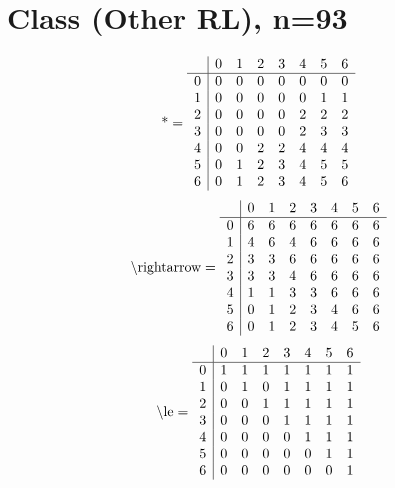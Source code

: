\documentclass[11pt]{article}
\begin{document}
\section{Class (Other RL), n=93}
\[\text{*} = 
\begin{array}{r | r r r r r r r}
 & 0 & 1 & 2 & 3 & 4 & 5 & 6 \\ \hline
0 & 0 & 0 & 0 & 0 & 0 & 0 & 0 \\
1 & 0 & 0 & 0 & 0 & 0 & 1 & 1 \\
2 & 0 & 0 & 0 & 0 & 2 & 2 & 2 \\
3 & 0 & 0 & 0 & 0 & 2 & 3 & 3 \\
4 & 0 & 0 & 2 & 2 & 4 & 4 & 4 \\
5 & 0 & 1 & 2 & 3 & 4 & 5 & 5 \\
6 & 0 & 1 & 2 & 3 & 4 & 5 & 6 \\
\end{array}
\]
\[\text{\textbackslash rightarrow} = 
\begin{array}{r | r r r r r r r}
 & 0 & 1 & 2 & 3 & 4 & 5 & 6 \\ \hline
0 & 6 & 6 & 6 & 6 & 6 & 6 & 6 \\
1 & 4 & 6 & 4 & 6 & 6 & 6 & 6 \\
2 & 3 & 3 & 6 & 6 & 6 & 6 & 6 \\
3 & 3 & 3 & 4 & 6 & 6 & 6 & 6 \\
4 & 1 & 1 & 3 & 3 & 6 & 6 & 6 \\
5 & 0 & 1 & 2 & 3 & 4 & 6 & 6 \\
6 & 0 & 1 & 2 & 3 & 4 & 5 & 6 \\
\end{array}
\]
\[\text{\textbackslash le} = 
\begin{array}{r | r r r r r r r}
 & 0 & 1 & 2 & 3 & 4 & 5 & 6 \\ \hline
0 & 1 & 1 & 1 & 1 & 1 & 1 & 1 \\
1 & 0 & 1 & 0 & 1 & 1 & 1 & 1 \\
2 & 0 & 0 & 1 & 1 & 1 & 1 & 1 \\
3 & 0 & 0 & 0 & 1 & 1 & 1 & 1 \\
4 & 0 & 0 & 0 & 0 & 1 & 1 & 1 \\
5 & 0 & 0 & 0 & 0 & 0 & 1 & 1 \\
6 & 0 & 0 & 0 & 0 & 0 & 0 & 1 \\
\end{array}
\]
\end{document}
